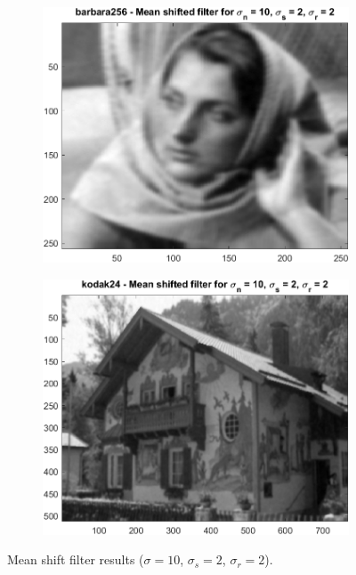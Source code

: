 \documentclass{article}
\begin{document}
\begin{figure}[H]
    \centering
    \begin{subfigure}[b]{0.45\textwidth}
        \includegraphics[width=\textwidth]{../images/barbara_10_2_2.png}
    \end{subfigure}
    \begin{subfigure}[b]{0.45\textwidth}
        \includegraphics[width=\textwidth]{../images/kodak_10_2_2.png}
    \end{subfigure}
    \caption{Mean shift filter results ($\sigma = 10$, $\sigma_s = 2$, $\sigma_r = 2$).}
\end{figure}
\end{document}
